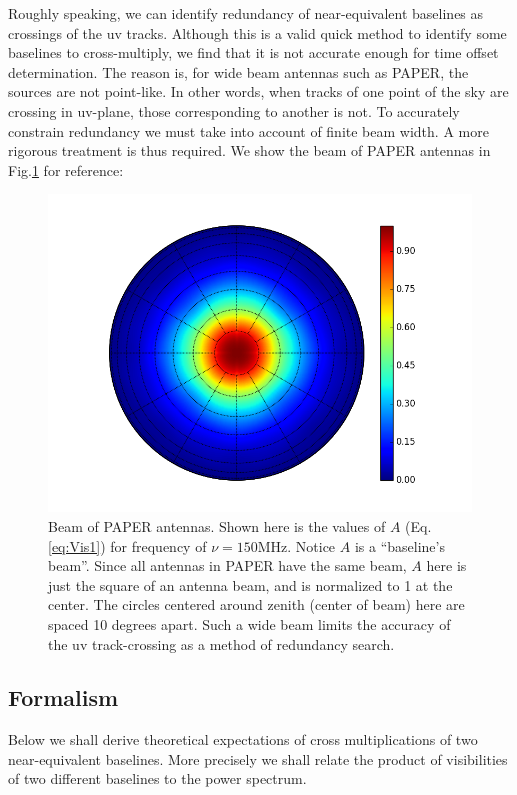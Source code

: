 \documentclass[preprint2,numberedappendix,tighten,twocolappendix]{aastex6}  %
\renewcommand\[{\begin{equation}}
\renewcommand\]{\end{equation}}
\begin{document}
Roughly speaking, we can identify
redundancy of near-equivalent baselines as crossings
of the uv tracks. Although this is a valid quick method to identify some baselines to cross-multiply, we find
that it is not accurate enough for time offset determination. The reason is, for wide beam antennas such as PAPER, the sources are not point-like. 
In other words, when tracks of
one point of the sky are crossing in uv-plane, those corresponding to another is not. To accurately
constrain redundancy we must take into account of finite beam width. A more rigorous treatment is thus required.  
We show the beam of PAPER antennas in Fig.\ref{fig:Beam} for reference:

\begin{figure}[H]
\includegraphics[width=\linewidth]{BEAM}

\caption{Beam of PAPER antennas. Shown here is the values of $A$ (Eq. \eqref{eq:Vis1})
for frequency of $\nu=150\text{MHz}$. Notice $A$ is a ``baseline's
beam''. Since all antennas in PAPER have the same beam, $A$ here
is just the square of an antenna beam, and is normalized to 1 at the
center. The circles centered around zenith (center of beam) here are
spaced 10 degrees apart. Such a wide beam limits the accuracy of the uv track-crossing as a method of redundancy search. \label{fig:Beam}}
\end{figure}



\subsection{Formalism}
Below we shall derive theoretical expectations of cross multiplications
of two near-equivalent baselines. More precisely we shall relate
the product of visibilities of two different baselines to the power spectrum. 
\end{document}
